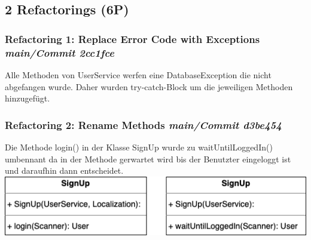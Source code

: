\subsection{2 Refactorings (6P)}

\subsubsection*{Refactoring 1: Replace Error Code with Exceptions \textit{main/Commit 2cc1fce}} 
Alle Methoden von UserService werfen eine DatabaseException die nicht abgefangen wurde. Daher wurden try-catch-Block um die jeweiligen Methoden hinzugefügt. 
\subsubsection*{Refactoring 2: Rename Methods \textit{main/Commit d3be454}}
Die Methode login() in der Klasse SignUp wurde zu waitUntilLoggedIn() umbennant da in der Methode gerwartet wird bis der Benutzter eingeloggt ist und daraufhin dann entscheidet. 
\newline\newline
\includegraphics[width=\linewidth]{kapitel7_refactoring/Refactor2.png}
 
